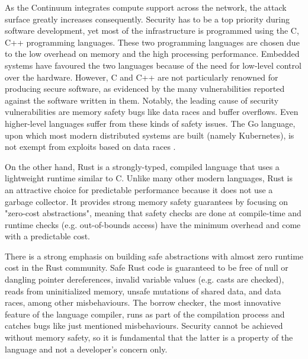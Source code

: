 As the Continuum integrates compute support across the network, the attack surface greatly increases consequently. Security has to be a top priority during software development, yet most of the infrastructure is programmed using the C, C++ programming languages. These two programming languages are chosen due to the low overhead on memory and the high processing performance. Embedded systems have favoured the two languages because of the need for low-level control over the hardware. However, C and C++ are not particularly renowned for producing secure software, as evidenced by the many vulnerabilities reported against the software written in them. Notably, the leading cause of security vulnerabilities are memory safety bugs like data races and buffer overflows. Even higher-level languages suffer from these kinds of safety issues. The Go language, upon which most modern distributed systems are built (namely Kubernetes), is not exempt from exploits based on data races \cite{go-data-races}.

On the other hand, Rust is a strongly-typed, compiled language that uses a lightweight runtime similar to C. Unlike many other modern languages, Rust is an attractive choice for predictable performance because it does not use a garbage collector. It provides strong memory safety guarantees by focusing on "zero-cost abstractions", meaning that safety checks are done at compile-time and runtime checks (e.g. out-of-bounds access) have the minimum overhead and come with a predictable cost.


There is a strong emphasis on building safe abstractions with almost zero runtime cost in the Rust community. Safe Rust code is guaranteed to be free of null or dangling pointer dereferences, invalid variable values (e.g. casts are checked), reads from uninitialized memory, unsafe mutations of shared data, and data races, among other misbehaviours.  The borrow checker, the most innovative feature of the language compiler, runs as part of the compilation process and catches bugs like just mentioned misbehaviours. Security cannot be achieved without memory safety, so it is fundamental that the latter is a property of the language and not a developer's concern only.

